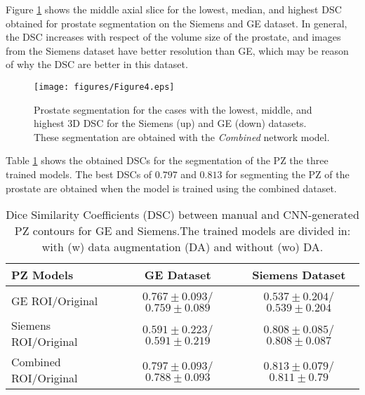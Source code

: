 Figure \ref{fig:resseg} shows the middle axial slice for the lowest, median, and highest DSC obtained for prostate segmentation on the Siemens and GE dataset. In general, the DSC increases with respect of the volume size of the prostate, and images from the Siemens dataset have better resolution than GE, which may be reason of why the DSC are better in this dataset. 
\begin{figure}[h]
    \centering
    \texttt{[image: figures/Figure4.eps]}
    \caption{Prostate segmentation for the cases with the lowest, middle, and highest 3D DSC for the Siemens (up) and GE (down) datasets. These segmentation are obtained with the \emph{Combined} network model.  }
    \label{fig:resseg}
\end{figure} 

Table \ref{tab:res_pz} shows the obtained DSCs for the segmentation of the PZ the three trained models.  The best DSCs of $0.797$ and $0.813$ for segmenting the PZ of the prostate are obtained when the model is trained using the combined dataset.  
 \begin{table}[h]
    \label{tab:res_pz}
    \caption{Dice Similarity Coefficients (DSC) between manual and CNN-generated PZ contours for GE and Siemens.The trained models are divided in: with (w) data augmentation (DA) and without (wo) DA.}
    \begin{tabular}{lcc}
         \hline
          \textbf{PZ Models} & \textbf{GE Dataset} & \textbf{Siemens Dataset}\\
         \hline
         GE ROI/Original & $0.767\pm0.093$/$0.759\pm0.089$ & $0.537\pm0.204$/$0.539\pm0.204$ \\
         \hline
         Siemens ROI/Original & $0.591\pm0.223$/$0.591\pm0.219$ & $0.808\pm0.085$/$0.808\pm0.087$ \\
         \hline
         Combined ROI/Original & $\mathbf{0.797\pm0.093}$/$0.788\pm0.093$ & $\mathbf{0.813\pm0.079}$/$0.811\pm0.79$\\
         \hline
    \end{tabular}
\end{table}

